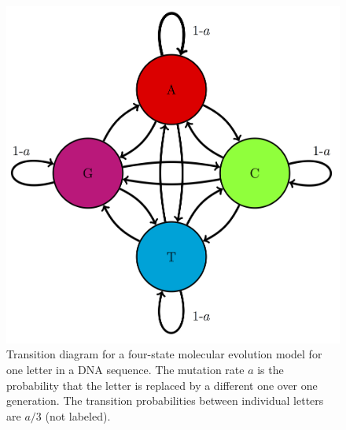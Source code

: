 \documentclass[
  letterpaper,
  DIV=11,
  numbers=noendperiod]{scrreprt}
\begin{document}
\begin{figure}

{\centering \includegraphics{./ch13/JC_trans_diag.png}

}

\caption{Transition diagram for a four-state molecular evolution
model for one letter in a DNA sequence. The
mutation rate \(a\) is the probability that the letter is replaced by a
different one over one generation. The transition probabilities between
individual letters are \(a/3\) (not labeled).}

\end{figure}
\end{document}
